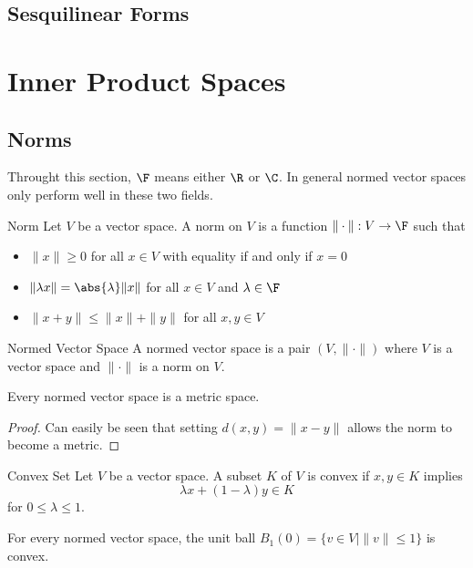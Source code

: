 \subsection{Sesquilinear Forms}

\pagebreak
\section{Inner Product Spaces}
\subsection{Norms}
Throught this section, $\F$ means either $\R$ or $\C$. In general normed vector spaces only perform well in these two fields. 
\begin{defn}{Norm}{} Let $V$ be a vector space. A norm on $V$ is a function $\|\cdot\|:V\to\F$ such that
\begin{itemize}
\item $\|x\|\geq 0$ for all $x\in V$ with equality if and only if $x=0$
\item $\|\lambda x\|=\abs{\lambda}\|x\|$ for all $x\in V$ and $\lambda\in\F$
\item $\|x+y\|\leq\|x\|+\|y\|$ for all $x,y\in V$
\end{itemize}
\end{defn}

\begin{defn}{Normed Vector Space}{} A normed vector space is a pair $(V,\|\cdot\|)$ where $V$ is a vector space and $\|\cdot\|$ is a norm on $V$. 
\end{defn}

\begin{prp}{}{} Every normed vector space is a metric space. \tcbline
\begin{proof} Can easily be seen that setting $d(x,y)=\|x-y\|$ allows the norm to become a metric. 
\end{proof}
\end{prp}

\begin{defn}{Convex Set}{} Let $V$ be a vector space. A subset $K$ of $V$ is convex if $x,y\in K$ implies $$\lambda x+(1-\lambda)y\in K$$ for $0\leq\lambda\leq 1$. 
\end{defn}

\begin{lmm}{}{} For every normed vector space, the unit ball $B_1(0)=\{v\in V|\|v\|\leq 1\}$ is convex. 
\end{lmm}

